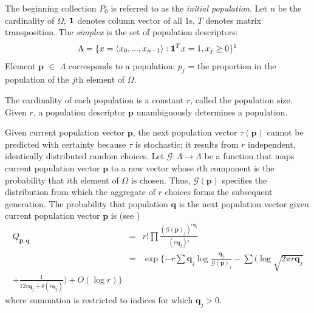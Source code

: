 The beginning collection $P_0$ is referred to as the {\em initial population}. Let $n$ be the cardinality 
of $\Omega$, ${\bf1}$ denotes column vector of all 1s, $T$ denotes matrix transposition. 
The {\em simplex} is the set of population descriptors:
\[
\Lambda = \{x = \langle x_0,...,x_{n-1} \rangle: {\bf1}^T x=1, x_j \geq 0 \} \text{\footnotemark\label{fnm:1}}
\]
Element $\bm{p}$ $\in$ $\Lambda$ corresponds to a population;
$p_j$ = the proportion in the population of the $j$th element of $\Omega$.

The cardinality of each population is a constant $r$, called the population size. 
Given $r$, a population descriptor $\bm{p}$ unambiguously determines a population.

Given current population vector $\bm{p}$, the next population vector $\tau(\bm{p})$ cannot 
be predicted with certainty because $\tau$ is stochastic; it results from $r$ independent, identically distributed random choices. 
Let $\mathcal{G}:\Lambda \rightarrow \Lambda$ be a function that maps 
current population vector $\bm{p}$ to a new vector whose $i$th component 
is the probability that $i$th element of $\Omega$ is chosen. Thus, $\mathcal{G}(\bm{p})$ 
specifies the distribution from which the aggregate 
of $r$ choices forms the subsequent generation. The probability that population $\bm{q}$ is 
the next population vector given current population vector $\bm{p}$ is (see \cite{Vose1999}) 
\begin{eqnarray}
\label{Qmat}
Q_{\bm{p},\bm{q}} & = & r! \prod \frac{(\mathcal{G}(\bm{p})_j)^{r\bm{q}_j}}{(r\bm{q}_j)!} \\
 & = & \exp\{-r \sum \bm{q}_j \log \frac{\bm{q}_j}{\mathcal{G}(\bm{p})_j} - \sum (\log \sqrt{2 \pi r\bm{q}_j} \\
 + \frac{1}{12r\bm{q}_j + \theta (r\bm{q}_j)}) + O(\log r)\}
\end{eqnarray}
where summation is restricted to indices for which $\bm{q}_j > 0$.

